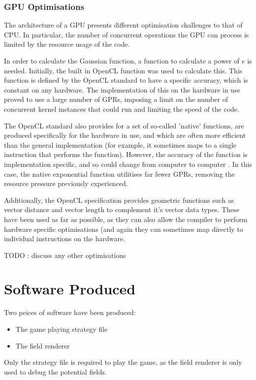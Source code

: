 \documentclass[10pt,british,english]{article}
\begin{document}
\subsubsection{\ac{GPU} Optimisations}

The architecture of a \ac{GPU} presents different optimisation challenges to that of \ac{CPU}. In particular, the number of concurrent operations the \ac{GPU} can process is limited by the resource usage of the code.

In order to calculate the Gaussian function, a function to calculate a power of $e$ is needed. Initially, the built in OpenCL function was used to calculate this. This function is defined by the OpenCL standard to have a specific accuracy, which is constant on any hardware. The implementation of this on the hardware in use proved to use a large number of \acp{GPR}, imposing a limit on the number of concurrent kernel instances that could run and limiting the speed of the code.

The OpenCL standard also provides for a set of so-called 'native' functions, are produced specifically for the hardware in use, and which are often more efficient than the general implementation (for example, it sometimes maps to a single instruction that performs the function). However, the accuracy of the function is implementation specific, and so could change from computer to computer \cite{openCl11Spec}. In this case, the native exponential function utilitises far fewer \acp{GPR}, removing the resource pressure previously experienced.

Additionally, the OpenCL specification provides geometric functions such as vector distance and vector length to complement it's vector data types. These have been used as far as possible, as they can also allow the compiler to perform hardware specific optimisations (and again they can sometimes map directly to individual instructions on the hardware.\cite{openCl11Spec}

TODO : discuss any other optimisations

\section{Software Produced}

Two peices of software have been produced:
\begin{itemize}
\item The game playing strategy file
\item The field renderer
\end{itemize}
Only the strategy file is required to play the game, as the field renderer is only used to debug the potential fields.
\end{document}
